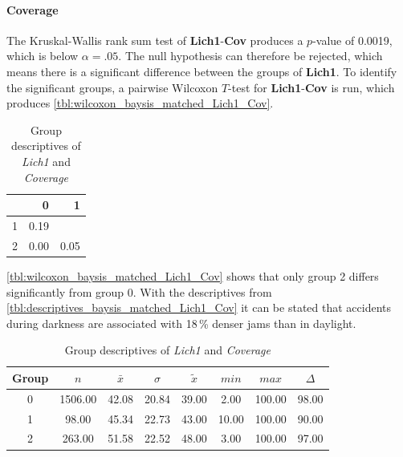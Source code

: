\paragraph{Coverage}
The Kruskal-Wallis rank sum test of \textbf{Lich1}-\textbf{Cov} produces a $p$-value of 0.0019, which is below $\alpha=.05$. The null hypothesis can therefore be rejected, which means there is a significant difference between the groups of \textbf{Lich1}. To identify the significant groups, a pairwise Wilcoxon $T$-test for \textbf{Lich1}-\textbf{Cov} is run, which produces \autoref{tbl:wilcoxon_baysis_matched_Lich1_Cov}. 
\begin{table}[ht]
	\small
	\centering
    \begin{tabular}{rrr}
        \toprule
        & 0 & 1 \\ 
        \midrule
        1 & 0.19 &  \\ 
        2 & 0.00 & 0.05 \\ 
        \bottomrule
      \end{tabular}
	\caption{Group descriptives of \textit{Lich1} and \textit{Coverage}}
	\label{tbl:wilcoxon_baysis_matched_Lich1_Cov}
\end{table}
\autoref{tbl:wilcoxon_baysis_matched_Lich1_Cov} shows that only group 2 differs significantly from group 0. With the descriptives from \autoref{tbl:descriptives_baysis_matched_Lich1_Cov} it can be stated that accidents during darkness are associated with 18\,\% denser jams than in daylight.
\begin{table}[ht]
	\small
	\centering
    \begin{tabular}{c|c|c|c|c|c|c|c}
        \toprule
        Group & $n$ & $\bar{x}$ & $\sigma$ & $\tilde{x}$ & $min$ & $max$ & $\Delta$ \\  
        \midrule
        0 & 1506.00 & 42.08 & 20.84 & 39.00 & 2.00 & 100.00 & 98.00 \\ 
        1 & 98.00 & 45.34 & 22.73 & 43.00 & 10.00 & 100.00 & 90.00 \\ 
        2 & 263.00 & 51.58 & 22.52 & 48.00 & 3.00 & 100.00 & 97.00 \\ 
        \bottomrule
      \end{tabular}
	\caption{Group descriptives of \textit{Lich1} and \textit{Coverage}}
	\label{tbl:descriptives_baysis_matched_Lich1_Cov}
\end{table}

